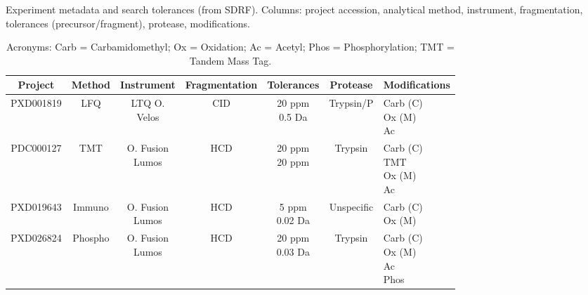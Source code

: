 \documentclass[12pt]{article}
\begin{document}
\begin{table}[h!]
\centering
\caption{Experiment metadata and search tolerances (from SDRF). Columns: project accession, analytical method, instrument, fragmentation, tolerances (precursor/fragment), protease, modifications.}
\begin{tabular}{|c|c|c|c|c|c|>{\centering\arraybackslash}p{5.5cm}|}
\hline
Project & Method & Instrument & Fragmentation & Tolerances & Protease & Modifications \\
\hline
PXD001819 & LFQ & \shortstack[c]{LTQ O.\\Velos} & CID & \shortstack[c]{20 ppm\\0.5 Da} & Trypsin/P & \shortstack[c]{Carb (C)\\Ox (M)\\Ac} \\
\hline
PDC000127 & TMT & \shortstack[c]{O. Fusion\\Lumos} & HCD & \shortstack[c]{20 ppm\\20 ppm} & Trypsin & \shortstack[c]{Carb (C)\\TMT\\Ox (M)\\Ac} \\
\hline
PXD019643 & Immuno & \shortstack[c]{O. Fusion\\Lumos} & HCD & \shortstack[c]{5 ppm\\0.02 Da} & Unspecific & \shortstack[c]{Carb (C)\\Ox (M)} \\
\hline
PXD026824 & Phospho & \shortstack[c]{O. Fusion\\Lumos} & HCD & \shortstack[c]{20 ppm\\0.03 Da} & Trypsin & \shortstack[c]{Carb (C)\\Ox (M)\\Ac\\Phos} \\
\hline
\end{tabular}
\caption*{\footnotesize Acronyms: Carb = Carbamidomethyl; Ox = Oxidation; Ac = Acetyl; Phos = Phosphorylation; TMT = Tandem Mass Tag.}
\label{tab:experiment_metadata}
\end{table}
\end{document}
